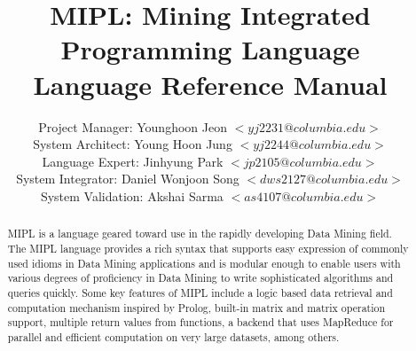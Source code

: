 \documentclass[prodmode,acmtecs]{acmsmall}
\begin{document}

\title{{MIPL: Mining Integrated Programming Language\\
Language Reference Manual}}
\author{Project Manager: Younghoon Jeon $<yj2231@columbia.edu>$\\
System Architect: Young Hoon Jung $<yj2244@columbia.edu>$\\
Language Expert: Jinhyung Park $<jp2105@columbia.edu>$\\
System Integrator: Daniel Wonjoon Song $<dws2127@columbia.edu>$\\
System Validation: Akshai Sarma $<as4107@columbia.edu>$
}

\begin{abstract}
MIPL is a language geared toward use in the rapidly developing Data Mining field. The MIPL 
language provides a rich syntax that supports easy expression of 
commonly used idioms in Data Mining applications and is modular
enough to enable users with various degrees of proficiency in
Data Mining to write sophisticated algorithms and queries quickly.
Some key features of MIPL include a logic based data retrieval and
computation mechanism inspired by Prolog, built-in matrix and matrix operation
support, multiple return values from functions, a backend that uses MapReduce
for parallel and efficient computation on very large datasets, among others.
\end{abstract}






\maketitle
\end{document}
